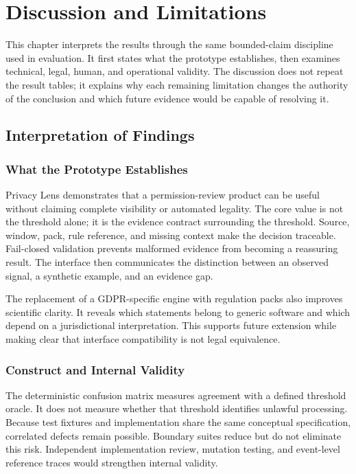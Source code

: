 \section{Discussion and Limitations}

This chapter interprets the results through the same bounded-claim discipline used in evaluation. It first states what the prototype establishes, then examines technical, legal, human, and operational validity. The discussion does not repeat the result tables; it explains why each remaining limitation changes the authority of the conclusion and which future evidence would be capable of resolving it.

\subsection{Interpretation of Findings}

\subsubsection{What the Prototype Establishes}

Privacy Lens demonstrates that a permission-review product can be useful without claiming complete visibility or automated legality. The core value is not the threshold alone; it is the evidence contract surrounding the threshold. Source, window, pack, rule reference, and missing context make the decision traceable. Fail-closed validation prevents malformed evidence from becoming a reassuring result. The interface then communicates the distinction between an observed signal, a synthetic example, and an evidence gap.

The replacement of a GDPR-specific engine with regulation packs also improves scientific clarity. It reveals which statements belong to generic software and which depend on a jurisdictional interpretation. This supports future extension while making clear that interface compatibility is not legal equivalence.

\subsubsection{Construct and Internal Validity}

The deterministic confusion matrix measures agreement with a defined threshold oracle. It does not measure whether that threshold identifies unlawful processing. Because test fixtures and implementation share the same conceptual specification, correlated defects remain possible. Boundary suites reduce but do not eliminate this risk. Independent implementation review, mutation testing, and event-level reference traces would strengthen internal validity.

